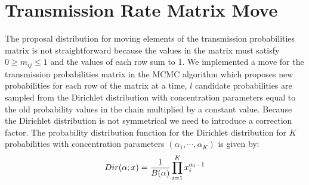 \documentclass[11pt,a4paper]{report}
\begin{document}
\section{Transmission Rate Matrix Move}
The proposal distribution for moving elements of the transmission probabilities matrix is not straightforward because the values in the matrix must satisfy $0 \geq m_{ij} \leq 1$ and the values of each row sum to 1. We implemented a move for the transmission probabilities matrix in the MCMC algorithm which proposes new probabilities for each row of the matrix at a time, $l$ candidate probabilities are sampled from the Dirichlet distribution with concentration parameters equal to the old probability values in the chain multiplied by a constant value. Because the Dirichlet distribution is not symmetrical we need to introduce a correction factor. The probability distribution function for the Dirichlet distribution for $K$ probabilities with concentration parameters $(\alpha_1,\cdots,\alpha_K)$ is given by:
\begin{equation}
Dir(\alpha;x) = \frac{1}{B( {\bf \alpha} )}\prod_{i=1}^{K} x_{i}^{\alpha_{i} - 1}
\end{equation}
\end{document}
